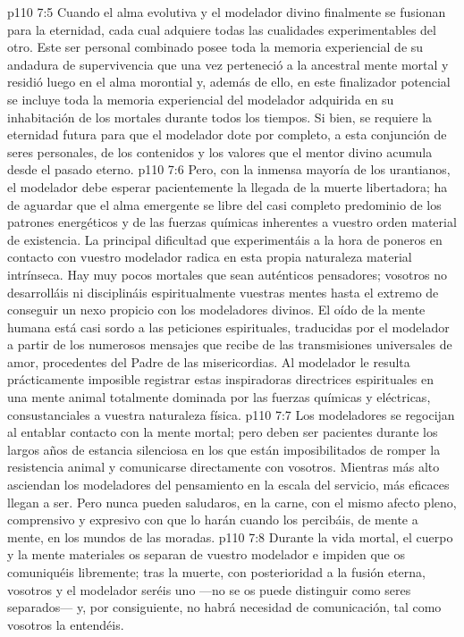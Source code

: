 \vs p110 7:5 Cuando el alma evolutiva y el modelador divino finalmente se fusionan para la eternidad, cada cual adquiere todas las cualidades experimentables del otro. Este ser personal combinado posee toda la memoria experiencial de su andadura de supervivencia que una vez perteneció a la ancestral mente mortal y residió luego en el alma morontial y, además de ello, en este finalizador potencial se incluye toda la memoria experiencial del modelador adquirida en su inhabitación de los mortales durante todos los tiempos. Si bien, se requiere la eternidad futura para que el modelador dote por completo, a esta conjunción de seres personales, de los contenidos y los valores que el mentor divino acumula desde el pasado eterno.
\vs p110 7:6 \pc Pero, con la inmensa mayoría de los urantianos, el modelador debe esperar pacientemente la llegada de la muerte libertadora; ha de aguardar que el alma emergente se libre del casi completo predominio de los patrones energéticos y de las fuerzas químicas inherentes a vuestro orden material de existencia. La principal dificultad que experimentáis a la hora de poneros en contacto con vuestro modelador radica en esta propia naturaleza material intrínseca. Hay muy pocos mortales que sean auténticos pensadores; vosotros no desarrolláis ni disciplináis espiritualmente vuestras mentes hasta el extremo de conseguir un nexo propicio con los modeladores divinos. El oído de la mente humana está casi sordo a las peticiones espirituales, traducidas por el modelador a partir de los numerosos mensajes que recibe de las transmisiones universales de amor, procedentes del Padre de las misericordias. Al modelador le resulta prácticamente imposible registrar estas inspiradoras directrices espirituales en una mente animal totalmente dominada por las fuerzas químicas y eléctricas, consustanciales a vuestra naturaleza física.
\vs p110 7:7 Los modeladores se regocijan al entablar contacto con la mente mortal; pero deben ser pacientes durante los largos años de estancia silenciosa en los que están imposibilitados de romper la resistencia animal y comunicarse directamente con vosotros. Mientras más alto asciendan los modeladores del pensamiento en la escala del servicio, más eficaces llegan a ser. Pero nunca pueden saludaros, en la carne, con el mismo afecto pleno, comprensivo y expresivo con que lo harán cuando los percibáis, de mente a mente, en los mundos de las moradas.
\vs p110 7:8 Durante la vida mortal, el cuerpo y la mente materiales os separan de vuestro modelador e impiden que os comuniquéis libremente; tras la muerte, con posterioridad a la fusión eterna, vosotros y el modelador seréis uno ---no se os puede distinguir como seres separados--- y, por consiguiente, no habrá necesidad de comunicación, tal como vosotros la entendéis.
